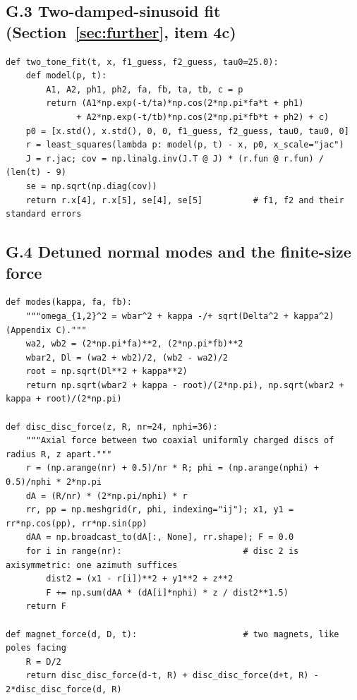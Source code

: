 \subsection*{G.3 Two-damped-sinusoid fit (Section~\ref{sec:further}, item 4c)}
\begin{lstlisting}
def two_tone_fit(t, x, f1_guess, f2_guess, tau0=25.0):
    def model(p, t):
        A1, A2, ph1, ph2, fa, fb, ta, tb, c = p
        return (A1*np.exp(-t/ta)*np.cos(2*np.pi*fa*t + ph1)
              + A2*np.exp(-t/tb)*np.cos(2*np.pi*fb*t + ph2) + c)
    p0 = [x.std(), x.std(), 0, 0, f1_guess, f2_guess, tau0, tau0, 0]
    r = least_squares(lambda p: model(p, t) - x, p0, x_scale="jac")
    J = r.jac; cov = np.linalg.inv(J.T @ J) * (r.fun @ r.fun) / (len(t) - 9)
    se = np.sqrt(np.diag(cov))
    return r.x[4], r.x[5], se[4], se[5]          # f1, f2 and their standard errors
\end{lstlisting}

\subsection*{G.4 Detuned normal modes and the finite-size force}
\begin{lstlisting}
def modes(kappa, fa, fb):
    """omega_{1,2}^2 = wbar^2 + kappa -/+ sqrt(Delta^2 + kappa^2)  (Appendix C)."""
    wa2, wb2 = (2*np.pi*fa)**2, (2*np.pi*fb)**2
    wbar2, Dl = (wa2 + wb2)/2, (wb2 - wa2)/2
    root = np.sqrt(Dl**2 + kappa**2)
    return np.sqrt(wbar2 + kappa - root)/(2*np.pi), np.sqrt(wbar2 + kappa + root)/(2*np.pi)

def disc_disc_force(z, R, nr=24, nphi=36):
    """Axial force between two coaxial uniformly charged discs of radius R, z apart."""
    r = (np.arange(nr) + 0.5)/nr * R; phi = (np.arange(nphi) + 0.5)/nphi * 2*np.pi
    dA = (R/nr) * (2*np.pi/nphi) * r
    rr, pp = np.meshgrid(r, phi, indexing="ij"); x1, y1 = rr*np.cos(pp), rr*np.sin(pp)
    dAA = np.broadcast_to(dA[:, None], rr.shape); F = 0.0
    for i in range(nr):                        # disc 2 is axisymmetric: one azimuth suffices
        dist2 = (x1 - r[i])**2 + y1**2 + z**2
        F += np.sum(dAA * (dA[i]*nphi) * z / dist2**1.5)
    return F

def magnet_force(d, D, t):                     # two magnets, like poles facing
    R = D/2
    return disc_disc_force(d-t, R) + disc_disc_force(d+t, R) - 2*disc_disc_force(d, R)
\end{lstlisting}
